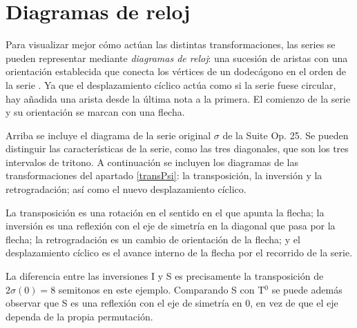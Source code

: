 	\section{Diagramas de reloj}
	\label{diagramas}
	
		\begin{wrapfigure}{R}{0.2\textwidth}
			\vspace{-\bigskipamount}
			\vspace{-\bigskipamount}
		\end{wrapfigure} Para visualizar mejor cómo actúan las distintas transformaciones, las series se pueden representar mediante \textit{diagramas de reloj}: una sucesión de aristas con una orientación establecida que conecta los vértices de un dodecágono en el orden de la serie \cite{hunter}. Ya que el desplazamiento cíclico actúa como si la serie fuese circular, hay añadida una arista desde la última nota a la primera. El comienzo de la serie y su orientación se marcan con una flecha.
		
		Arriba se incluye el diagrama de la serie original $\sigma$ de la Suite Op. 25. Se pueden distinguir las características de la serie, como las tres diagonales, que son los tres intervalos de tritono. A continuación se incluyen los diagramas de las transformaciones del apartado \ref{transPsi}: la transposición, la inversión y la retrogradación; así como el nuevo desplazamiento cíclico.
		
\begin{changemargin}{-15pt}{-15pt}
	\begin{multicols}{4}
	\end{multicols}
\end{changemargin}
		
		La transposición es una rotación en el sentido en el que apunta la flecha; la inversión es una reflexión con el eje de simetría en la diagonal que pasa por la flecha; la retrogradación es un cambio de orientación de la flecha; y el desplazamiento cíclico es el avance interno de la flecha por el recorrido de la serie.		
		
		La diferencia entre las inversiones I y S es precisamente la transposición de $2\sigma(0)=8$ semitonos en este ejemplo. Comparando S con T$^0$ se puede además observar que S es una reflexión con el eje de simetría en 0, en vez de que el eje dependa de la propia permutación.
		
